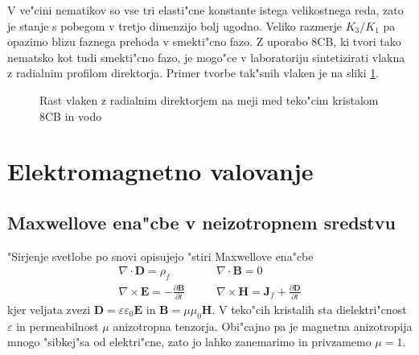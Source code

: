 \documentclass[12pt,twoside,openright,final]{report}
\newcommand{\odvod}[2]{\frac{\partial #1}{\partial #2}}
\renewcommand{\vec}{\mathbf}
\begin{document}
V ve"cini nematikov so vse tri elasti"cne konstante istega velikostnega reda, zato je stanje s pobegom v tretjo dimenzijo bolj ugodno. 
Veliko razmerje $K_3/K_1$ pa opazimo blizu faznega prehoda v smekti"cno fazo. 
Z uporabo 8CB, ki tvori tako nematsko kot tudi smekti"cno fazo, je mogo"ce v laboratoriju sintetizirati vlakna z radialnim profilom direktorja\cite{peddireddy}. 
Primer tvorbe tak"snih vlaken je na sliki \ref{fig:tvorjenje}. 

\begin{figure}[h]
 \centering
 \caption{Rast vlaken z radialnim direktorjem na meji med teko"cim kristalom 8CB in vodo\cite{peddireddy}}
 \label{fig:tvorjenje}
\end{figure}

\chapter{Elektromagnetno valovanje}

\section{Maxwellove ena"cbe v neizotropnem sredstvu}
"Sirjenje svetlobe po snovi opisujejo "stiri Maxwellove ena"cbe
\begin{equation}
\begin{aligned}
 \nabla \cdot \vec D = \rho_f & \qquad \nabla \cdot \vec B = 0 \\
 \nabla \times \vec E = -\odvod{\vec B}{t} & \qquad \nabla \times \vec H = \vec J_f + \odvod{\vec D}{t}
\end{aligned} 
\end{equation}
kjer veljata zvezi $\vec D = \varepsilon \varepsilon_0 \vec E$ in $\vec B = \mu \mu_0 \vec H$. 
V teko"cih kristalih sta dielektri"cnost $\varepsilon$ in permeabilnost $\mu$ anizotropna tenzorja. 
Obi"cajno pa je magnetna anizotropija mnogo "sibkej"sa od elektri"cne, zato jo lahko zanemarimo in privzamemo $\mu = 1$. 
\end{document}
